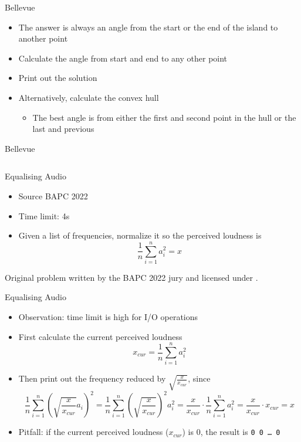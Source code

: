 \documentclass[11pt,pdf, aspectratio=169]{beamer}
\begin{document}
  \begin{frame}{Bellevue}
    \begin{itemize}
      \item<1-> The answer is always an angle from the start or the end of the island to another point
      \item<2-> Calculate the angle from start and end to any other point
      \item<2-> Print out the solution
      \item<3-> Alternatively, calculate the convex hull
      \begin{itemize}
        \item<3-> The best angle is from either the first and second point in the hull or the last and previous
      \end{itemize}
    \end{itemize}
  \end{frame}
  \begin{frame}[containsverbatim]{Bellevue}
    \inputminted{python}{code/session-1/python/bapc-b.py}
  \end{frame}
  \begin{frame}{Equalising Audio}
    \begin{itemize}
      \item Source BAPC 2022
      \item Time limit: 4s
      \item  Given a list of frequencies, normalize it so the perceived loudness is \[\frac{1}{n} \sum^n_{i=1}a_i^2=x\]
    \end{itemize}
    Original problem written by the BAPC 2022 jury and licensed under \doclicenseLongNameRef.

    \doclicenseImage
  \end{frame}
  \begin{frame}{Equalising Audio}
    \begin{itemize}
      \item<1-> Observation: time limit is high for I/O operations
      \item<2-> First calculate the current perceived loudness \[x_{cur} = \frac{1}{n} \sum^n_{i=1}a_i^2\]
      \item<3-> Then print out the frequency reduced by $\sqrt{\frac{x}{x_{cur}}}$, since
      \[\frac{1}{n} \sum^n_{i=1}\left(\sqrt{\frac{x}{x_{cur}}}a_i\right)^2 = \frac{1}{n} \sum^n_{i=1}\left(\sqrt{\frac{x}{x_{cur}}}\right)^2a_i^2 = \frac{x}{x_{cur}}\cdot \frac{1}{n}\sum^n_{i=1}a_i^2 = \frac{x}{x_{cur}}\cdot x_{cur} = x\]
      \item<4-> Pitfall: if the current perceived loudness ($x_{cur}$) is 0, the result is \texttt{0 0 \ldots{} 0}
    \end{itemize}
  \end{frame}
\end{document}
